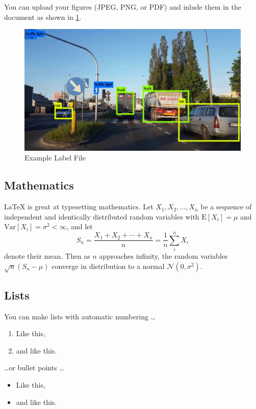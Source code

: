 You can upload your figures (JPEG, PNG, or PDF) and inlude them in the document as shown in \ref{fig:your-figure}.

\begin{figure}[h!]
\includegraphics[width=\textwidth]{detection.jpg}
\caption{\label{fig:your-figure}Example Label File}
\end{figure}

\subsection*{Mathematics}

\LaTeX{} is great at typesetting mathematics. Let $X_1, X_2, \ldots, X_n$ be a sequence of independent and identically distributed random variables with $\text{E}[X_i] = \mu$ and $\text{Var}[X_i] = \sigma^2 < \infty$, and let
$$S_n = \frac{X_1 + X_2 + \cdots + X_n}{n}
= \frac{1}{n}\sum_{i}^{n} X_i$$
denote their mean. Then as $n$ approaches infinity, the random variables $\sqrt{n}(S_n - \mu)$ converge in distribution to a normal $\mathcal{N}(0, \sigma^2)$.

\subsection*{Lists}

You can make lists with automatic numbering \dots

\begin{enumerate}
	\item Like this,
	\item and like this.
\end{enumerate}
\dots or bullet points \dots
\begin{itemize}
	\item Like this,
	\item and like this.
\end{itemize}

